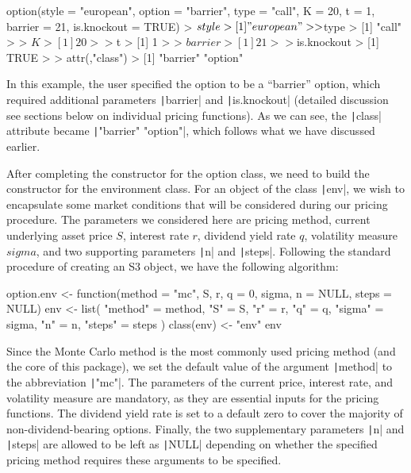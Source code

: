\begin{Rminted}
option(style = "european",
       option = "barrier",
       type = "call",
       K = 20,
       t = 1,
       barrier = 21,
       is.knockout = TRUE)
> $style
> [1] "european"
> 
> $type
> [1] "call"
> 
> $K
> [1] 20
> 
> $t
> [1] 1
> 
> $barrier
> [1] 21
> 
> $is.knockout
> [1] TRUE
> 
> attr(,"class")
> [1] "barrier" "option"
\end{Rminted}

In this example, the user specified the option to be a ``barrier'' option, which required additional parameters \texttt|barrier| and \texttt|is.knockout| (detailed discussion see sections below on individual pricing functions). As we can see, the \texttt|class| attribute became \texttt|"barrier" "option"|, which follows what we have discussed earlier.

After completing the constructor for the option class, we need to build the constructor for the environment class. For an object of the class \texttt|env|, we wish to encapsulate some market conditions that will be considered during our pricing procedure. The parameters we considered here are pricing method, current underlying asset price $S$, interest rate $r$, dividend yield rate $q$, volatility measure $sigma$, and two supporting parameters \texttt|n| and \texttt|steps|. Following the standard procedure of creating an S3 object, we have the following algorithm:

\begin{Rminted}
option.env <- function(method = "mc", S, r, q = 0, sigma, n = NULL, steps = NULL) {
    env <- list(
        "method" = method,
        "S" = S,
        "r" = r,
        "q" = q,
        "sigma" = sigma,
        "n" = n,
        "steps" = steps
    )
    class(env) <- "env"
    env
}
\end{Rminted}

Since the Monte Carlo method is the most commonly used pricing method (and the core of this package), we set the default value of the argument \texttt|method| to the abbreviation \texttt|"mc"|. The parameters of the current price, interest rate, and volatility measure are mandatory, as they are essential inputs for the pricing functions. The dividend yield rate is set to a default zero to cover the majority of non-dividend-bearing options. Finally, the two supplementary parameters \texttt|n| and \texttt|steps| are allowed to be left as \texttt|NULL| depending on whether the specified pricing method requires these arguments to be specified.

